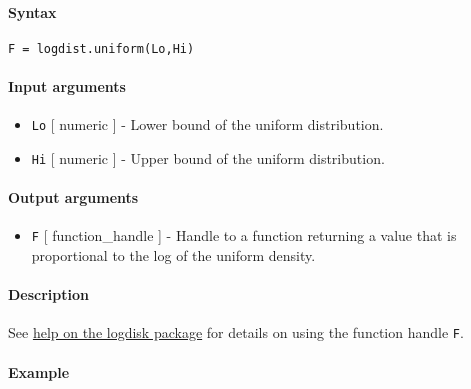 


	\paragraph{Syntax}

\begin{verbatim}
F = logdist.uniform(Lo,Hi)
\end{verbatim}

\paragraph{Input arguments}

\begin{itemize}
\item
  \texttt{Lo} {[} numeric {]} - Lower bound of the uniform distribution.
\item
  \texttt{Hi} {[} numeric {]} - Upper bound of the uniform distribution.
\end{itemize}

\paragraph{Output arguments}

\begin{itemize}
\itemsep1pt\parskip0pt
\item
  \texttt{F} {[} function\_handle {]} - Handle to a function returning a
  value that is proportional to the log of the uniform density.
\end{itemize}

\paragraph{Description}

See \href{logdist/Contents}{help on the logdisk package} for details on
using the function handle \texttt{F}.

\paragraph{Example}



